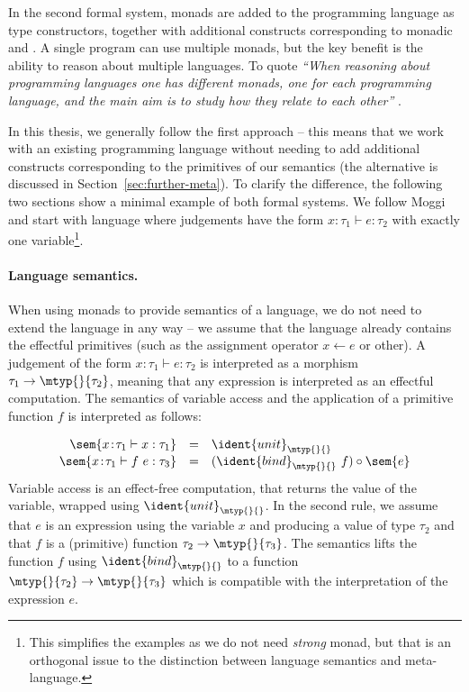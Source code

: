 In the second formal system, monads are added to the programming language as type constructors,
together with additional constructs corresponding to monadic  and .
A single program can use multiple monads, but the key benefit is the ability to reason
about multiple languages. To quote \emph{``When reasoning about programming languages one has different
monads, one for each programming language, and the main aim is to study how they relate to each
other''} \cite[p. 5]{monad-notions}.

In this thesis, we generally follow the first approach -- this means that we work with an existing
programming language without needing to add additional constructs corresponding to the primitives
of our semantics (the alternative is discussed in Section~\ref{sec:further-meta}). To clarify the
difference, the following two sections show a minimal example of both formal systems. We follow
Moggi and start with language where judgements have the form $x\!:\!\tau_1 \vdash e : \tau_2$ with
exactly one variable\footnote{This simplifies the examples as we do not need \emph{strong} monad,
but that is an orthogonal issue to the distinction between language semantics and meta-language.}.


\paragraph{Language semantics.} When using monads to provide semantics of a language, we do not
need to extend the language in any way -- we assume that the language already contains the
effectful primitives (such as the assignment operator $x \leftarrow e$ or other). A judgement
of the form $x\!:\!\tau_1 \vdash e : \tau_2$ is interpreted as a morphism $\tau_1 \rightarrow \mtyp{}{\tau_2}$,
meaning that any expression is interpreted as an effectful computation. The semantics of variable
access and the application of a primitive function $f$ is interpreted as follows:

\begin{equation*}
\begin{array}{rcl}
 \sem{x\!:\!\tau_1 \vdash x : \tau_1} &=& \ident{unit}_\mtyp{}{}\\
 \sem{x\!:\!\tau_1 \vdash f~e : \tau_3} &=& (\ident{bind}_\mtyp{}{}~f) \circ \sem{e}\\
\end{array}
\end{equation*}
%
Variable access is an effect-free computation, that returns the value of the variable, wrapped
using $\ident{unit}_\mtyp{}{}$. In the second rule, we assume that $e$ is an expression using
the variable $x$ and producing a value of type $\tau_2$ and that $f$ is a (primitive) function
$\tau_2 \rightarrow \mtyp{}{\tau_3}$. The semantics lifts the function $f$ using $\ident{bind}_\mtyp{}{}$
to a function $\mtyp{}{\tau_2} \rightarrow \mtyp{}{\tau_3}$ which is compatible with the
interpretation of the expression $e$.

